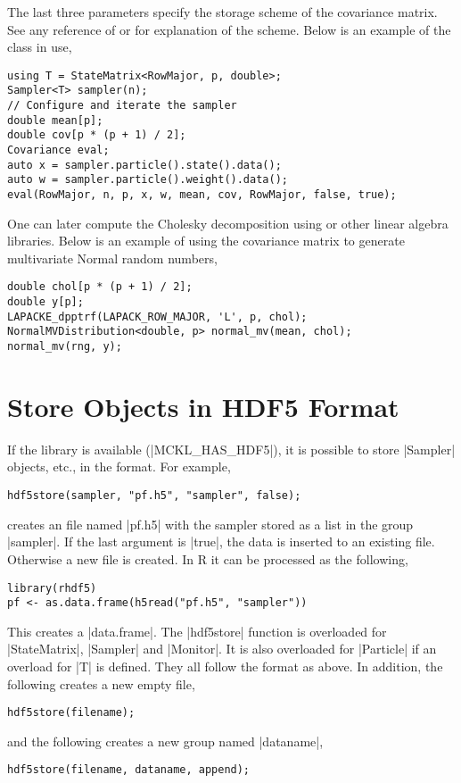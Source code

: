 The last three parameters specify the storage scheme of the covariance matrix.
See any reference of \blas or \lapack for explanation of the scheme. Below is
an example of the class in use,
\begin{verbatim}
using T = StateMatrix<RowMajor, p, double>;
Sampler<T> sampler(n);
// Configure and iterate the sampler
double mean[p];
double cov[p * (p + 1) / 2];
Covariance eval;
auto x = sampler.particle().state().data();
auto w = sampler.particle().weight().data();
eval(RowMajor, n, p, x, w, mean, cov, RowMajor, false, true);
\end{verbatim}
One can later compute the Cholesky decomposition using \lapack or other linear
algebra libraries. Below is an example of using the covariance matrix to
generate multivariate Normal random numbers,
\begin{verbatim}
double chol[p * (p + 1) / 2];
double y[p];
LAPACKE_dpptrf(LAPACK_ROW_MAJOR, 'L', p, chol);
NormalMVDistribution<double, p> normal_mv(mean, chol);
normal_mv(rng, y);
\end{verbatim}

\section{Store Objects in HDF5 Format}
\label{sec:Store Objects in HDF5 Format}

If the \hdf library is available (|MCKL_HAS_HDF5|), it is possible to store
|Sampler| objects, etc., in the \hdf format. For example,
\begin{verbatim}
hdf5store(sampler, "pf.h5", "sampler", false);
\end{verbatim}
creates an \hdf file named |pf.h5| with the sampler stored as a list in the
group |sampler|. If the last argument is |true|, the data is inserted to an
existing file. Otherwise a new file is created. In R it can be processed as the
following,
\begin{verbatim}
library(rhdf5)
pf <- as.data.frame(h5read("pf.h5", "sampler"))
\end{verbatim}
This creates a |data.frame|. The |hdf5store| function is overloaded for
|StateMatrix|, |Sampler| and |Monitor|. It is also overloaded for |Particle| if
an overload for |T| is defined. They all follow the format as above. In
addition, the following creates a new empty \hdf file,
\begin{verbatim}
hdf5store(filename);
\end{verbatim}
and the following creates a new group named |dataname|,
\begin{verbatim}
hdf5store(filename, dataname, append);
\end{verbatim}

